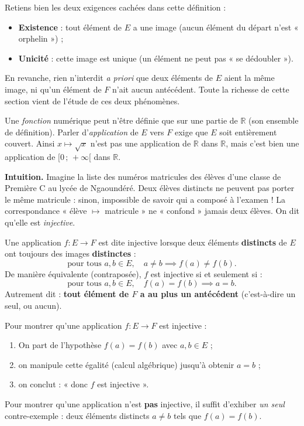 \documentclass[11pt]{article}
\newcommand{\cle}[1]{{\popxbold\color{popdark}#1}}
\newcounter{popsec}
\newcounter{popsub}
\newcommand{\courssub}[1]{%
  \stepcounter{popsub}%
  \par\vspace{9pt}\noindent{\popxbold\fontsize{11.5}{13}\selectfont\color{popink}{\color{poporange}\thepopsec.\thepopsub}\hspace{6pt}#1}\par\nopagebreak\vspace{4pt}
}
\begin{document}
Retiens bien les deux exigences cachées dans cette définition :
\begin{itemize}
\item \textbf{Existence} : tout élément de $E$ a une image (aucun élément du départ n'est « orphelin ») ;
\item \textbf{Unicité} : cette image est unique (un élément ne peut pas « se dédoubler »).
\end{itemize}

En revanche, rien n'interdit \emph{a priori} que deux éléments de $E$ aient la même image, ni qu'un élément de $F$ n'ait aucun antécédent. Toute la richesse de cette section vient de l'étude de ces deux phénomènes.

\begin{attention}
Une \emph{fonction} numérique peut n'être définie que sur une partie de $\mathbb{R}$ (son ensemble de définition). Parler d'\emph{application} de $E$ vers $F$ exige que $E$ soit entièrement couvert. Ainsi $x \mapsto \sqrt{x}$ n'est pas une application de $\mathbb{R}$ dans $\mathbb{R}$, mais c'est bien une application de $[0\,;\,+\infty[$ dans $\mathbb{R}$.
\end{attention}

\courssub{Applications injectives}

\textbf{Intuition.} Imagine la liste des numéros matricules des élèves d'une classe de Première C au lycée de Ngaoundéré. Deux élèves distincts ne peuvent pas porter le même matricule : sinon, impossible de savoir qui a composé à l'examen ! La correspondance « élève $\mapsto$ matricule » ne « confond » jamais deux élèves. On dit qu'elle est \emph{injective}.

\begin{definition}
Une application $f : E \to F$ est dite \cle{injective} lorsque deux éléments \textbf{distincts} de $E$ ont toujours des images \textbf{distinctes} :
\[ \text{pour tous } a, b \in E, \quad a \neq b \implies f(a) \neq f(b). \]
De manière équivalente (contraposée), $f$ est injective si et seulement si :
\[ \text{pour tous } a, b \in E, \quad f(a) = f(b) \implies a = b. \]
Autrement dit : \textbf{tout élément de $F$ a au plus un antécédent} (c'est-à-dire un seul, ou aucun).
\end{definition}

\begin{methode}
Pour montrer qu'une application $f : E \to F$ est injective :
\begin{enumerate}
\item On part de l'hypothèse $f(a) = f(b)$ avec $a, b \in E$ ;
\item on manipule cette égalité (calcul algébrique) jusqu'à obtenir $a = b$ ;
\item on conclut : « donc $f$ est injective ».
\end{enumerate}
Pour montrer qu'une application n'est \textbf{pas} injective, il suffit d'exhiber \emph{un seul} contre-exemple : deux éléments distincts $a \neq b$ tels que $f(a) = f(b)$.
\end{methode}
\end{document}
